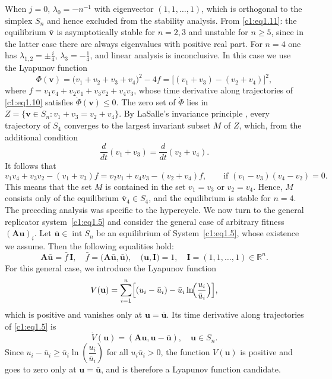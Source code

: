\documentclass[12pt]{report}
\newcommand{\R}{\mathbb{R}}
\theoremstyle{definition}
\theoremstyle{remark}
\begin{document}
When $j=0$, $\lambda_{0}=-n^{-1}$ with eigenvector $(1,1,\ldots,1)$,
which is orthogonal to the simplex $S_{n}$ and hence excluded from
the stability analysis.  From \eqref{c1:eq1.11}: the equilibrium
$\bar{\mathbf{v}}$ is asymptotically stable for $n=2,3$ and unstable
for $n\geqslant 5$, since in the latter case there are always
eigenvalues with positive real part.  For $n=4$ one has
$\lambda_{1,2}=\pm\frac{i}{4}$, $\lambda_{3}=-\frac{1}{4}$, and
linear analysis is inconclusive.  In this case we use the Lyapunov function
\[
\Phi(\mathbf{v}) = \bigl(v_1+v_2+v_3+v_4\bigr)^2 - 4f
= \bigl[(v_1+v_3)-(v_2+v_4)\bigr]^2,
\]
where $f = v_1v_4 + v_2v_1 + v_3v_2 + v_4v_3$, 
whose time derivative along trajectories of \eqref{c1:eq1.10} satisfies
$\dot{\Phi}(\mathbf{v})\leqslant 0$.  The zero set of $\dot\Phi$ lies
in $Z=\{\mathbf{v}\in S_{n}:v_{1}+v_{3}=v_{2}+v_{4}\}$.
By LaSalle's invariance principle \cite{c1:LaSalle1961}, 
every trajectory of $S_{4}$ converges to the largest invariant subset
$M$ of $Z$, which, from the additional condition
\[\frac{d}{dt}(v_{1}+v_{3})=\frac{d}{dt}(v_{2}+v_{4}).\]
It follows that
\[
v_{1}v_{4}+v_{3}v_{2}-(v_{1}+v_{3})f
= v_{2}v_{1}+v_{4}v_{3}-(v_{2}+v_{4})f,
\qquad\text{if }(v_{1}-v_{3})(v_{4}-v_{2})=0.
\]
This means that the set $M$ is contained in the set $v_{1}=v_{3}$ or $v_{2}=v_{4}$. Hence, $M$  consists only of the equilibrium $\bar{\mathbf{v}}_{4}\in S_{4}$, and the equilibrium is stable for $n=4$.
\medskip
The preceding analysis was specific to the hypercycle. We now turn to the general replicator system~\eqref{c1:eq1.5} and consider the general case of arbitrary fitness $(\mathbf{Au})_i$.
Let $\bar{\mathbf{u}}\in\operatorname{int}S_{n}$ be an equilibrium of
System~\eqref{c1:eq1.5}, whose existence we assume. Then the following
equalities hold:
\begin{equation}
	\mathbf{A}\bar{\mathbf{u}}=\bar{f}\,\mathbf{I},\quad
	\bar{f}=\bigl(\mathbf{A}\bar{\mathbf{u}},\bar{\mathbf{u}}\bigr),\quad
	\bigl(\mathbf{u},\mathbf{I}\bigr)=1,\quad
	\mathbf{I}=(1,1,\ldots,1)\in\R^{n}.
	\label{c1:eq1.12}
\end{equation}
For this general case, we introduce the Lyapunov function
\begin{equation}
  V(\mathbf{u})
  =\sum_{i=1}^{n}\Bigl[(u_{i}-\bar{u}_{i})
   -\bar{u}_{i}\ln\!\Bigl(\frac{u_{i}}{\bar{u}_{i}}\Bigr)\Bigr],
  \label{c1:eq1.13}
\end{equation}
which is positive and vanishes only at $\mathbf{u}=\bar{\mathbf{u}}$.
Its time derivative along trajectories of \eqref{c1:eq1.5} is
\begin{equation}
  \dot{V}(\mathbf{u})=(\mathbf{Au},\mathbf{u}-\bar{\mathbf{u}}),
  \quad \mathbf{u}\in S_{n}.
  \label{c1:eq1.14}
\end{equation}
Since $u_i - \bar{u}_i \geqslant \bar{u}_i \ln\!\left(\dfrac{u_i}{\bar{u}_i}\right)$
for all $u_i\bar{u}_i > 0$, the function $V(\mathbf{u})$ is positive
and goes to zero only at $\mathbf{u}=\bar{\mathbf{u}}$, and is therefore
a Lyapunov function candidate.
\end{document}
